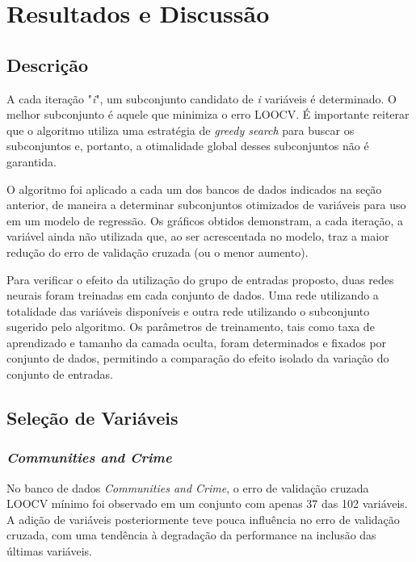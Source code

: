 \chapter[Resultados e Discussão]{Resultados e Discussão}

\section{Descrição}

A cada iteração "\textit{i}", um subconjunto candidato de \textit{i} variáveis é determinado. O melhor subconjunto é aquele que minimiza o erro LOOCV. É importante reiterar que o algoritmo utiliza uma estratégia de \textit{greedy search} para buscar os subconjuntos e, portanto, a otimalidade global desses subconjuntos não é garantida.

O algoritmo foi aplicado a cada um dos bancos de dados indicados na seção anterior, de maneira a determinar subconjuntos otimizados de variáveis para uso em um modelo de regressão. Os gráficos obtidos demonstram, a cada iteração, a variável ainda não utilizada que, ao ser acrescentada no modelo, traz a maior redução do erro de validação cruzada (ou o menor aumento). 

Para verificar o efeito da utilização do grupo de entradas proposto, duas redes neurais foram treinadas em cada conjunto de dados. Uma rede utilizando a totalidade das variáveis disponíveis e outra rede utilizando o subconjunto sugerido pelo algoritmo. Os parâmetros de treinamento, tais como taxa de aprendizado e tamanho da camada oculta, foram determinados e fixados por conjunto de dados, permitindo a comparação do efeito isolado da variação do conjunto de entradas.



\section{Seleção de Variáveis}

\subsection{\textit{Communities and Crime}}

No banco de dados \textit{Communities and Crime}, o erro de validação cruzada LOOCV mínimo foi observado em um conjunto com apenas 37 das 102 variáveis. A adição de variáveis posteriormente teve pouca influência no erro de validação cruzada, com uma tendência à degradação da performance na inclusão das últimas variáveis.

